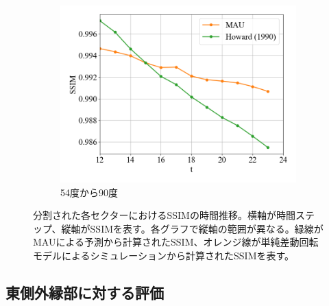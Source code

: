 \begin{figure}[htbp]
            \begin{subfigure}{0.5\textwidth}
              \centering
              \includegraphics[width=\textwidth]{figures/exp2/lng_ssim_5.png}
              \caption{54度から90度}
            \end{subfigure}
          \caption{分割された各セクターにおけるSSIMの時間推移。横軸が時間ステップ、縦軸がSSIMを表す。各グラフで縦軸の範囲が異なる。緑線がMAUによる予測から計算されたSSIM、オレンジ線が単純差動回転モデルによるシミュレーションから計算されたSSIMを表す。}
          \label{fig:exp2_lng_ssim}
        \end{figure}


    \subsection{東側外縁部に対する評価}

